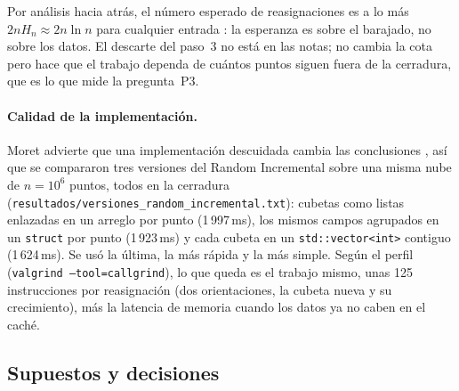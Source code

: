\documentclass[11pt,letterpaper]{article}
\newcommand{\ran}{\textsf{Random Incremental}}
\newcommand{\code}[1]{\texttt{#1}}
\begin{document}
Por análisis hacia atrás, el número esperado de reasignaciones es a lo más
$2nH_n\approx 2n\ln n$ para cualquier entrada \cite{cmu}: la esperanza es sobre
el barajado, no sobre los datos. El descarte del paso~3 no está en las notas;
no cambia la cota pero hace que el trabajo dependa de cuántos puntos siguen
fuera de la cerradura, que es lo que mide la pregunta~P3.

\paragraph{Calidad de la implementación.} Moret advierte que una implementación
descuidada cambia las conclusiones \cite{moret}, así que se compararon tres
versiones del \ran{} sobre una misma nube de $n=10^6$ puntos, todos en la
cerradura (\code{resultados/versiones\_random\_incremental.txt}): cubetas como
listas enlazadas en un arreglo por punto (1\,997\,ms), los mismos campos
agrupados en un \code{struct} por punto (1\,923\,ms) y cada cubeta en un
\code{std::vector<int>} contiguo (1\,624\,ms). Se usó la última, la más rápida y
la más simple. Según el perfil (\code{valgrind --tool=callgrind}), lo que queda
es el trabajo mismo, unas 125 instrucciones por reasignación (dos
orientaciones, la cubeta nueva y su crecimiento), más la latencia de memoria
cuando los datos ya no caben en el caché.

\subsection{Supuestos y decisiones}
\label{sec:supuestos}
\end{document}
